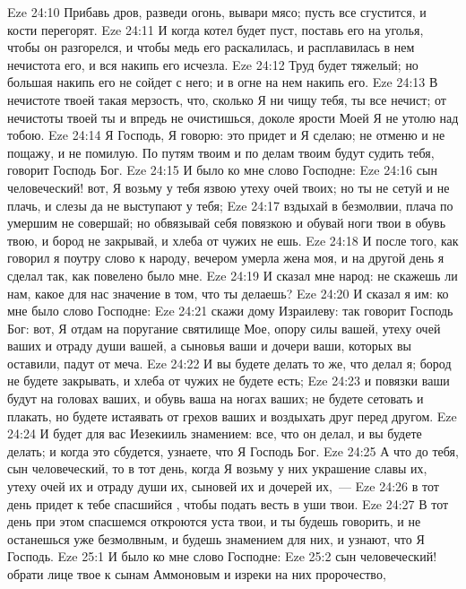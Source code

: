 \vs Eze 24:10 Прибавь дров, разведи огонь, вывари мясо; пусть все сгустится, и кости перегорят.
\vs Eze 24:11 И когда котел будет пуст, поставь его на уголья, чтобы он разгорелся, и чтобы медь его раскалилась, и расплавилась в нем нечистота его, и вся накипь его исчезла.
\vs Eze 24:12 Труд будет тяжелый; но большая накипь его не сойдет с него; и в огне  на нем накипь его.
\vs Eze 24:13 В нечистоте твоей такая мерзость, что, сколько Я ни чищу тебя, ты все нечист; от нечистоты твоей ты и впредь не очистишься, доколе ярости Моей Я не утолю над тобою.
\vs Eze 24:14 Я Господь, Я говорю: это придет и Я сделаю; не отменю и не пощажу, и не помилую. По путям твоим и по делам твоим будут судить тебя, говорит Господь Бог.
\rsbpar\vs Eze 24:15 И было ко мне слово Господне:
\vs Eze 24:16 сын человеческий! вот, Я возьму у тебя язвою утеху очей твоих; но ты не сетуй и не плачь, и слезы да не выступают у тебя;
\vs Eze 24:17 вздыхай в безмолвии, плача по умершим не совершай; но обвязывай себя повязкою и обувай ноги твои в обувь твою, и бород не закрывай, и хлеба от чужих не ешь.
\vs Eze 24:18 И после того, как говорил я поутру слово к народу, вечером умерла жена моя, и на другой день я сделал так, как повелено было мне.
\vs Eze 24:19 И сказал мне народ: не скажешь ли нам, какое для нас значение в том, что ты делаешь?
\vs Eze 24:20 И сказал я им: ко мне было слово Господне:
\vs Eze 24:21 скажи дому Израилеву: так говорит Господь Бог: вот, Я отдам на поругание святилище Мое, опору силы вашей, утеху очей ваших и отраду души вашей, а сыновья ваши и дочери ваши, которых вы оставили, падут от меча.
\vs Eze 24:22 И вы будете делать то же, что делал я; бород не будете закрывать, и хлеба от чужих не будете есть;
\vs Eze 24:23 и повязки ваши будут на головах ваших, и обувь ваша на ногах ваших; не будете сетовать и плакать, но будете истаявать от грехов ваших и воздыхать друг перед другом.
\vs Eze 24:24 И будет для вас Иезекииль знамением: все, что он делал, и вы будете делать; и когда это сбудется, узнаете, что Я Господь Бог.
\vs Eze 24:25 А что до тебя, сын человеческий, то в тот день, когда Я возьму у них украшение славы их, утеху очей их и отраду души их, сыновей их и дочерей их,~---
\vs Eze 24:26 в тот день придет к тебе спасшийся , чтобы подать весть в уши твои.
\vs Eze 24:27 В тот день при этом спасшемся откроются уста твои, и ты будешь говорить, и не останешься уже безмолвным, и будешь знамением для них, и узнают, что Я Господь.
\vs Eze 25:1 И было ко мне слово Господне:
\vs Eze 25:2 сын человеческий! обрати лице твое к сынам Аммоновым и изреки на них пророчество,

